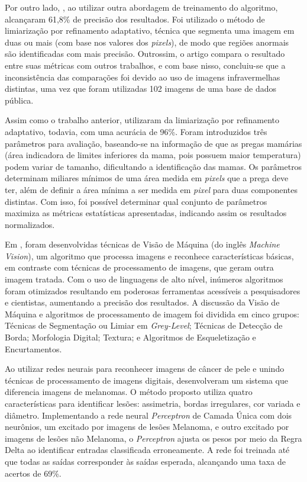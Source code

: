 Por outro lado, , ao utilizar outra abordagem de treinamento do algoritmo, alcançaram 61,8\% de precisão dos resultados. Foi utilizado o método de limiarização por refinamento adaptativo, técnica que segmenta uma imagem em duas ou mais (com base nos valores dos \textit{pixels}), de modo que regiões anormais são identificadas com mais precisão. Outrossim, o artigo compara o resultado entre suas métricas com outros trabalhos, e com base nisso, concluiu-se que a inconsistência das comparações foi devido ao uso de imagens infravermelhas distintas, uma vez que foram utilizadas 102 imagens de uma base de dados pública.

Assim como o trabalho anterior,  utilizaram da limiarização por refinamento adaptativo, todavia, com uma acurácia de 96\%. Foram introduzidos três parâmetros para avaliação, baseando-se na informação de que as pregas mamárias (área indicadora de limites inferiores da mama, pois possuem maior temperatura) podem variar de tamanho, dificultando a identificação das mamas. Os parâmetros determinam miliares mínimos de uma área medida em \textit{pixels} que a prega deve ter, além de definir a área mínima a ser medida em \textit{pixel} para duas componentes distintas. Com isso, foi possível determinar qual conjunto de parâmetros maximiza as métricas estatísticas apresentadas, indicando assim os resultados normalizados.

Em , foram desenvolvidas técnicas de Visão de Máquina (do inglês \textit{Machine Vision}), um algoritmo que processa imagens e reconhece características básicas, em contraste com técnicas de processamento de imagens, que geram outra imagem tratada. Com o uso de linguagens de alto nível, inúmeros algoritmos foram otimizados resultando em poderosas ferramentas acessíveis a pesquisadores e cientistas, aumentando a precisão dos resultados. A discussão da Visão de Máquina e algoritmos de processamento de imagem foi dividida em cinco grupos: Técnicas de Segmentação ou Limiar em \textit{Grey-Level}; Técnicas de Detecção de Borda; Morfologia Digital; Textura; e Algoritmos de Esqueletização e Encurtamentos.


Ao utilizar redes neurais para reconhecer imagens de câncer de pele e unindo técnicas de processamento de imagens digitais,  desenvolveram um sistema que diferencia imagens de melanomas. O método proposto utiliza quatro características para identificar lesões: assimetria, bordas irregulares, cor variada e diâmetro. Implementando a rede neural \textit{Perceptron} de Camada Única com dois neurônios, um excitado por imagens de lesões Melanoma, e outro excitado por imagens de lesões não Melanoma, o \textit{Perceptron} ajusta os pesos por meio da Regra Delta ao identificar entradas classificada erroneamente. A rede foi treinada até que todas as saídas corresponder às saídas esperada, alcançando uma taxa de acertos de 69\%.

